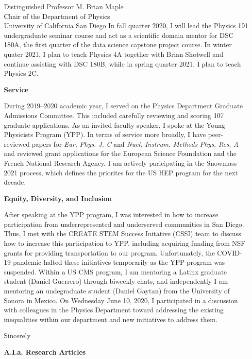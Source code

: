 \documentclass[ucsd,cs,11pt]{ucletter}
\begin{document}
\begin{letter}{
  Distinguished Professor M. Brian Maple\\
  Chair of the Department of Physics\\
  University of California San Diego
}
In fall quarter 2020, I will lead the Physics 191 undergraduate seminar course and act as a scientific domain mentor for DSC 180A, the first quarter of the data science capstone project course.
In winter quater 2021, I plan to teach Physics 4A together with Brian Shotwell and continue assisting with DSC 180B, while in spring quarter 2021, I plan to teach Physics 2C.

\textbf{Service}

During 2019--2020 academic year, I served on the Physics Department Graduate Admissions Committee.
This included carefully reviewing and scoring 107 graduate applications.
As an invited faculty speaker, I spoke at the Young Physicists Program (YPP).
In terms of service more broadly, I have peer-reviewed papers for \emph{Eur. Phys. J. C} and \emph{Nucl. Instrum. Methods Phys. Res. A} and reviewed grant applications for the European Science Foundation and the French National Research Agency.
I am actively paricipating in the Snowmass 2021 process, which defines the priorites for the US HEP program for the next decade.

\textbf{Equity, Diversity, and Inclusion}

After speaking at the YPP program, I was interested in how to increase participation from underrepresented and underserved communities in San Diego.
Thus, I met with the CREATE STEM Success Initative (CSSI) team to discuss how to increase this participation to YPP, including acquiring funding from NSF grants for providing transportation to our program.
Unfortunately, the COVID-19 pandemic halted these initiatives temporarily as the YPP program was suspended.
Within a US CMS program, I am mentoring a Latinx graduate student (Daniel Guerrero) through biweekly chats, and independently I am mentoring an undegraduate student (Daniel Gaytan) from the University of Sonora in Mexico.
On Wednesday June 10, 2020, I participated in a discussion with colleagues in the Physics Department toward addressing the existing inequalities within our department and new initiatives to address them.

\closing{Sincerely}
\end{letter}


\nocite{*}
\printbibliography[heading=none]
\clearpage

\setcounter{page}{4}

\Large
\textbf{A.I.a. Research Articles}
\vspace{10pt}
\printbibliography[heading=none,keyword=career]
\end{document}
